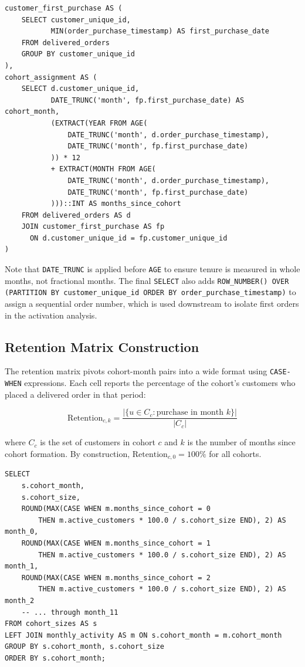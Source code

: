 \begin{lstlisting}[style=sql, caption={Cohort assignment and tenure calculation (from \filepath{sql/01\_cohort\_assignment.sql})}]
customer_first_purchase AS (
    SELECT customer_unique_id,
           MIN(order_purchase_timestamp) AS first_purchase_date
    FROM delivered_orders
    GROUP BY customer_unique_id
),
cohort_assignment AS (
    SELECT d.customer_unique_id,
           DATE_TRUNC('month', fp.first_purchase_date) AS cohort_month,
           (EXTRACT(YEAR FROM AGE(
               DATE_TRUNC('month', d.order_purchase_timestamp),
               DATE_TRUNC('month', fp.first_purchase_date)
           )) * 12
           + EXTRACT(MONTH FROM AGE(
               DATE_TRUNC('month', d.order_purchase_timestamp),
               DATE_TRUNC('month', fp.first_purchase_date)
           )))::INT AS months_since_cohort
    FROM delivered_orders AS d
    JOIN customer_first_purchase AS fp
      ON d.customer_unique_id = fp.customer_unique_id
)
\end{lstlisting}

Note that \texttt{DATE\_TRUNC} is applied before \texttt{AGE} to ensure tenure
is measured in whole months, not fractional months. The final \texttt{SELECT}
also adds \texttt{ROW\_NUMBER() OVER (PARTITION BY customer\_unique\_id ORDER BY
order\_purchase\_timestamp)} to assign a sequential order number, which is used
downstream to isolate first orders in the activation analysis.

\subsection{Retention Matrix Construction}

The retention matrix pivots cohort-month pairs into a wide format using
\texttt{CASE-WHEN} expressions. Each cell reports the percentage of the cohort's
customers who placed a delivered order in that period:

\begin{equation}
\text{Retention}_{c,k} = \frac{\left|\{u \in C_c : \text{purchase in month } k\}\right|}{|C_c|}
\label{eq:retention}
\end{equation}

where $C_c$ is the set of customers in cohort $c$ and $k$ is the number of months
since cohort formation. By construction, $\text{Retention}_{c,0} = 100\%$ for
all cohorts.

\begin{lstlisting}[style=sql, caption={Retention matrix pivot (excerpt from \filepath{sql/02\_retention\_matrix.sql})}]
SELECT
    s.cohort_month,
    s.cohort_size,
    ROUND(MAX(CASE WHEN m.months_since_cohort = 0
        THEN m.active_customers * 100.0 / s.cohort_size END), 2) AS month_0,
    ROUND(MAX(CASE WHEN m.months_since_cohort = 1
        THEN m.active_customers * 100.0 / s.cohort_size END), 2) AS month_1,
    ROUND(MAX(CASE WHEN m.months_since_cohort = 2
        THEN m.active_customers * 100.0 / s.cohort_size END), 2) AS month_2
    -- ... through month_11
FROM cohort_sizes AS s
LEFT JOIN monthly_activity AS m ON s.cohort_month = m.cohort_month
GROUP BY s.cohort_month, s.cohort_size
ORDER BY s.cohort_month;
\end{lstlisting}

